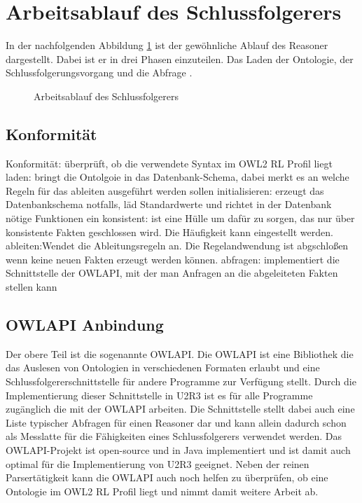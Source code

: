 \section{Arbeitsablauf des Schlussfolgerers}

In der nachfolgenden Abbildung \ref{image-u2r3-workflow} ist der gewöhnliche Ablauf des Reasoner dargestellt. Dabei ist er in drei Phasen einzuteilen. Das Laden der Ontologie, der Schlussfolgerungsvorgang und die Abfrage .

\begin{figure}
	\caption{Arbeitsablauf des Schlussfolgerers}
	\label{image-u2r3-workflow}
\begin{center}
\end{center}
\end{figure}

\subsection{Konformität}
Konformität: überprüft, ob die verwendete Syntax im OWL2 RL Profil liegt
laden: bringt die Ontolgoie in das Datenbank-Schema, dabei merkt es an welche Regeln für das ableiten ausgeführt werden sollen
initialisieren: erzeugt das Datenbankschema notfalls, läd Standardwerte und richtet in der Datenbank nötige Funktionen ein
konsistent: ist eine Hülle um dafür zu sorgen, das nur über konsistente Fakten geschlossen wird. Die Häufigkeit kann eingestellt werden.
ableiten:Wendet die Ableitungsregeln an. Die Regelandwendung ist abgschloßen wenn keine neuen Fakten erzeugt werden können.
abfragen: implementiert die Schnittstelle der OWLAPI, mit der man Anfragen an die abgeleiteten Fakten stellen kann

\subsection{OWLAPI Anbindung}

Der obere Teil ist die sogenannte OWLAPI. Die OWLAPI ist eine Bibliothek die das Auslesen von Ontologien in verschiedenen Formaten erlaubt und eine Schlussfolgererschnittstelle für andere Programme zur Verfügung stellt. Durch die Implementierung dieser Schnittstelle in U2R3 ist es für alle Programme zugänglich die mit der OWLAPI arbeiten.
Die Schnittstelle stellt dabei auch eine Liste typischer Abfragen für einen Reasoner dar und kann allein dadurch schon als Messlatte für die Fähigkeiten eines Schlussfolgerers verwendet werden. Das OWLAPI-Projekt ist open-source und in Java implementiert und ist damit auch optimal für die Implementierung von U2R3 geeignet. Neben der reinen Parsertätigkeit kann die OWLAPI auch noch helfen zu überprüfen, ob eine Ontologie im OWL2 RL Profil liegt und nimmt damit weitere Arbeit ab.

